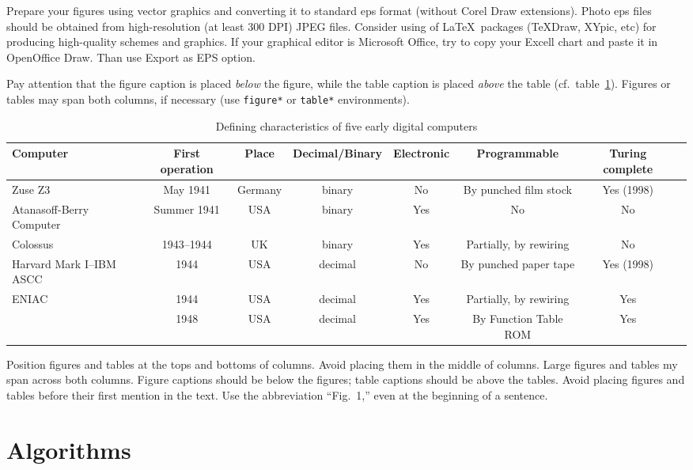 \documentclass[a4paper,conference]{IEEEtran}
\begin{document}
Prepare your figures using vector graphics and converting it to standard eps format (without Corel Draw extensions). Photo eps files should be obtained from high-resolution (at least 300 DPI) JPEG files. Consider using of \LaTeX\ packages (TeXDraw, XYpic, etc) for producing high-quality schemes and graphics. If your graphical editor is Microsoft Office, try to copy your Excell chart and paste it in OpenOffice Draw. Than use Export as EPS option.


Pay attention that the figure caption is placed \emph{below} the figure, while the table caption is placed \emph{above} the table (cf.~table~\ref{table}). Figures or tables may span both columns, if necessary (use \texttt{figure*} or \texttt{table*} environments).


\begin{table}[tbp]
\caption{Defining characteristics of five early digital computers}\label{table}
\centering
\begin{tabular}{|@{\vrule width0ptheight9pt\enspace}l|c|c|c|c|c|c|c|}\hline
\hfil\bf Computer&\bf First operation&\bf Place& \bf Decimal/Binary&\bf Electronic&\bf Programmable&\bf Turing complete\\\hline
Zuse Z3&May 1941&Germany&binary&No&By punched film stock&Yes (1998)\\\hline
Atanasoff-Berry Computer&Summer 1941&USA&binary&Yes&No&No\\\hline
Colossus&1943--1944&UK&binary&Yes&Partially, by rewiring&No\\\hline
Harvard Mark I--IBM ASCC&1944&USA&decimal&No&By punched paper tape&Yes (1998)\\\hline
\multirow{2}{*}{ENIAC}&1944&USA&decimal&Yes&Partially, by rewiring&Yes\\\cline{2-7}
&1948&USA&decimal&Yes&By Function Table ROM&Yes\\\hline
\end{tabular}
\end{table}

Position figures and tables at the tops and bottoms of columns.  Avoid placing them in the middle of columns.  Large figures and tables my span across both columns.  Figure captions should be below the figures; table captions should be above the tables.  Avoid placing figures and tables before their first mention in the text.  Use the abbreviation ``Fig.~1,'' even at the beginning of a sentence.


\section{Algorithms}
\end{document}
